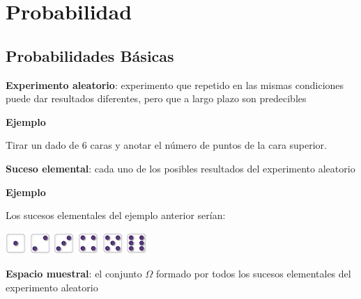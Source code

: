 \documentclass[]{book}
\begin{document}
\hypertarget{probabilidad}{%
\chapter{Probabilidad}\label{probabilidad}}

\hypertarget{probabilidades-buxe1sicas}{%
\section{Probabilidades Básicas}\label{probabilidades-buxe1sicas}}

 \textbf{Experimento aleatorio}: experimento que repetido en las mismas condiciones puede dar resultados diferentes, pero que a largo plazo son predecibles

\textbf{Ejemplo}

Tirar un dado de 6 caras y anotar el número de puntos de la cara superior.

\textbf{Suceso elemental}: cada uno de los posibles resultados del experimento aleatorio

\textbf{Ejemplo}

Los sucesos elementales del ejemplo anterior serían:

\includegraphics{Images/proba1dibujos/dice/1.png} \includegraphics{Images/proba1dibujos/dice/2.png} \includegraphics{Images/proba1dibujos/dice/3.png} \includegraphics{Images/proba1dibujos/dice/4.png} \includegraphics{Images/proba1dibujos/dice/5.png} \includegraphics{Images/proba1dibujos/dice/6.png}

 \textbf{Espacio muestral}: el conjunto \(\Omega\) formado por todos los sucesos elementales del experimento aleatorio
\end{document}
